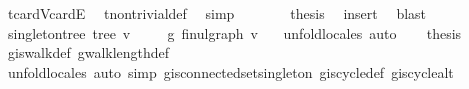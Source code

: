 \begin{isabellebody}
\ t{\isachardot}{\kern0pt}card{\isacharunderscore}{\kern0pt}V{\isacharunderscore}{\kern0pt}card{\isacharunderscore}{\kern0pt}E\ \isamarkupfalse%
\ t{\isachardot}{\kern0pt}non{\isacharunderscore}{\kern0pt}trivial{\isacharunderscore}{\kern0pt}def\ \isamarkupfalse%
\ simp\isanewline
\ \ \ \ \isamarkupfalse%
\ \isamarkupfalse%
\ {\isacharquery}{\kern0pt}thesis\ \isamarkupfalse%
\ insert\ \isamarkupfalse%
\ blast\isanewline
\ \ \isamarkupfalse%
\isanewline
{}\isamarkupfalse%
%
\endisatagproof
{\isafoldproof}%
%
\isadelimproof
\isanewline
%
\endisadelimproof
\isanewline
{}\isamarkupfalse%
\isanewline
\isanewline
{}\isamarkupfalse%
\ singleton{\isacharunderscore}{\kern0pt}tree{\isacharcolon}{\kern0pt}\ {\isachardoublequoteopen}tree\ {\isacharbraceleft}{\kern0pt}v{\isacharbraceright}{\kern0pt}\ {\isacharbraceleft}{\kern0pt}{\isacharbraceright}{\kern0pt}{\isachardoublequoteclose}\isanewline
%
\isadelimproof
%
\endisadelimproof
%
\isatagproof
{}\isamarkupfalse%
{\isacharminus}{\kern0pt}\isanewline
\ \ \isamarkupfalse%
\ g{\isacharcolon}{\kern0pt}\ fin{\isacharunderscore}{\kern0pt}ulgraph\ {\isachardoublequoteopen}{\isacharbraceleft}{\kern0pt}v{\isacharbraceright}{\kern0pt}{\isachardoublequoteclose}\ {\isachardoublequoteopen}{\isacharbraceleft}{\kern0pt}{\isacharbraceright}{\kern0pt}{\isachardoublequoteclose}\ \isamarkupfalse%
\ {\isacharparenleft}{\kern0pt}unfold{\isacharunderscore}{\kern0pt}locales{\isacharcomma}{\kern0pt}\ auto{\isacharparenright}{\kern0pt}\isanewline
\ \ \isamarkupfalse%
\ {\isacharquery}{\kern0pt}thesis\ \isamarkupfalse%
\ g{\isachardot}{\kern0pt}is{\isacharunderscore}{\kern0pt}walk{\isacharunderscore}{\kern0pt}def\ g{\isachardot}{\kern0pt}walk{\isacharunderscore}{\kern0pt}length{\isacharunderscore}{\kern0pt}def\ \isamarkupfalse%
\ {\isacharparenleft}{\kern0pt}unfold{\isacharunderscore}{\kern0pt}locales{\isacharcomma}{\kern0pt}\ auto\ simp{\isacharcolon}{\kern0pt}\ g{\isachardot}{\kern0pt}is{\isacharunderscore}{\kern0pt}connected{\isacharunderscore}{\kern0pt}set{\isacharunderscore}{\kern0pt}singleton\ g{\isachardot}{\kern0pt}is{\isacharunderscore}{\kern0pt}cycle{}{\isacharunderscore}{\kern0pt}def\ g{\isachardot}{\kern0pt}is{\isacharunderscore}{\kern0pt}cycle{\isacharunderscore}{\kern0pt}alt{\isacharparenright}{\kern0pt}\isanewline
{}\isamarkupfalse%
%
\endisatagproof

\end{isabellebody}

